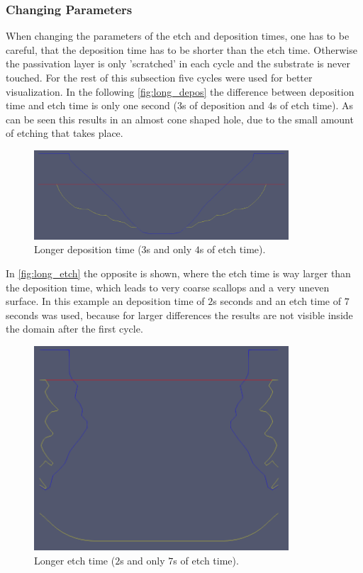 \documentclass[12pt,a4paper]{article}
\begin{document}
\subsubsection{Changing Parameters} \label{sec:Change_Params}
When changing the parameters of the etch and deposition times, one has to be careful, that the deposition time has to be shorter than the etch time. Otherwise the passivation layer is only 'scratched' in each cycle and the substrate is never touched.
For the rest of this subsection five cycles were used for better visualization.
In the following \autoref{fig:long_depos} the difference between deposition time and etch time is only one second ($3$s of deposition and $4$s of etch time). As can be seen this results in an almost cone shaped hole, due to the small amount of etching that takes place.
 \begin{figure}[H]
	\centering \includegraphics[width=9.5cm]{figures/longer_depos.png}
	\caption{Longer deposition time ($3$s and only $4$s of etch time).} 
    \label{fig:long_depos}
\end{figure}
In \autoref{fig:long_etch} the opposite is shown, where the etch time is way larger than the deposition time, which leads to very coarse scallops and a very uneven surface. In this example an deposition time of $2$s seconds and an etch time of $7$ seconds was used, because for larger differences the results are not visible inside the domain after the first cycle.
\begin{figure}[H]
	\centering \includegraphics[width=9.5cm]{figures/longer_etch.png}
	\caption{Longer etch time ($2$s and only $7$s of etch time).} 
    \label{fig:long_etch}
\end{figure}
\end{document}
